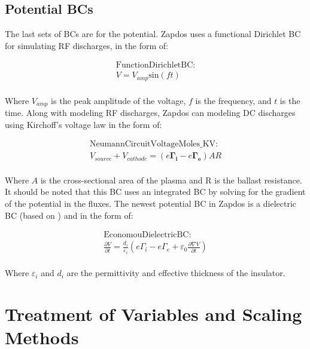 \documentclass[final]{report}
\begin{document}
  \subsection{Potential BCs}

  The last sets of BCs are for the potential. Zapdos uses a functional Dirichlet BC for simulating RF discharges, in the form of:

  \begin{equation}
  \begin{gathered}
    \text{FunctionDirichletBC:} \\
    V = V_{amp}\text{sin}(ft)
  \end{gathered}
  \end{equation}
  \\
  Where $V_{amp}$ is the peak amplitude of the voltage, $f$ is the frequency, and $t$ is the time. Along with modeling RF discharges, Zapdos can modeling DC discharges using Kirchoff’s voltage law in the form of:

  \begin{equation}
  \begin{gathered}
    \text{NeumannCircuitVoltageMoles}\_\text{KV:} \\
    V_{source}+V_{cathode}=(e\mathbf{\Gamma_{i}}-e\mathbf{\Gamma_{e}})AR
  \end{gathered}
  \end{equation}
  \\
  Where $A$ is the cross-sectional area of the plasma and R is the ballast resistance. It should be noted that this BC uses an integrated BC by solving for the gradient of the potential in the fluxes. The newest potential BC in Zapdos is a dielectric BC (based  on \cite{2D_GEC_100mTorr}) and in the form of:

  \begin{equation}
  \begin{gathered}
    \text{EconomouDielectricBC:} \\
    \frac{\partial V}{\partial t} = \frac{d_{i}}{\varepsilon_{i}} \left( e\Gamma_{i}-e\Gamma_{e} + \varepsilon_{0}\frac{\partial \nabla V}{\partial t} \right)
  \end{gathered}
  \end{equation}
  \\
  Where $\varepsilon_{i}$ and $d_{i}$ are the permittivity and effective thickness of the insulator.

  \section{Treatment of Variables and Scaling Methods}
\end{document}
